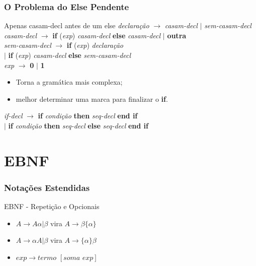 \documentclass[table]{beamer}
\begin{document}
\begin{frame}
   \frametitle{O Problema do Else Pendente}
   \begin{block}{Apenas casam-decl antes de um else}
   \textit{declaração} $\to$ \textit{casam-decl} $|$ \textit{sem-casam-decl} \\
   \textit{casam-decl} $\to$ \textbf{if} (\textit{exp}) \textit{casam-decl} \textbf{else} \textit{casam-decl} $|$ \textbf{outra} \\
   \textit{sem-casam-decl} $\to$ \textbf{if} (\textit{exp}) \textit{declaração} \\ 
   $|$ \textbf{if} (\textit{exp}) \textit{casam-decl} \textbf{else} \textit{sem-casam-decl} \\
   \textit{exp} $\to$ \textbf{0} $|$ \textbf{1}
   \end{block}
   \begin{itemize}
      \item Torna a gramática mais complexa;
      \item melhor determinar uma marca para finalizar o \textbf{if}.
   \end{itemize}
   \textit{if-decl} $\to$ \textbf{if} \textit{condição} \textbf{then} \textit{seq-decl} \textbf{end if} \\
   $|$ \textbf{if} \textit{condição} \textbf{then} \textit{seq-decl} \textbf{else} \textit{seq-decl} \textbf{end if}
\end{frame}

\section{EBNF}
\begin{frame}
   \frametitle{Notações Estendidas}
   \begin{block}{EBNF - Repetição e Opcionais}
      \begin{itemize}
         \item $A \to A\alpha|\beta$ vira $A \to \beta\{\alpha\}$
         \item $A \to \alpha A|\beta$ vira $A \to \{\alpha\}\beta$
	 \item $\textit{exp} \to \textit{termo } [\textit{soma exp}]$
      \end{itemize}
   \end{block}
\end{frame}
\end{document}
